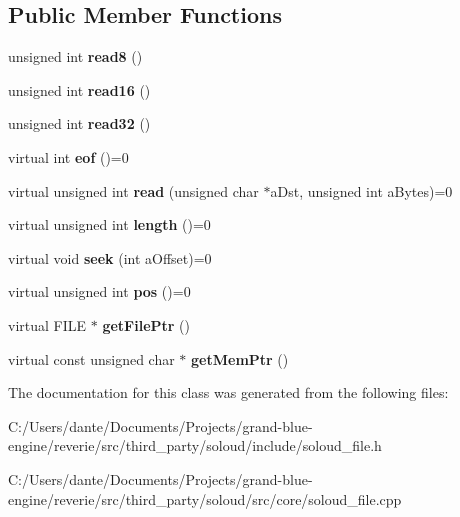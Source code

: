 \subsection*{Public Member Functions}
\begin{DoxyCompactItemize}
\item 
\mbox{\label{class_so_loud_1_1_file_a3197f0c2cb0fa1a22e1d97ddac0cb87c}} 
unsigned int {\bfseries read8} ()
\item 
\mbox{\label{class_so_loud_1_1_file_a04257b2a791b22e5bef066584fa3a7e6}} 
unsigned int {\bfseries read16} ()
\item 
\mbox{\label{class_so_loud_1_1_file_a637dbdf79b7afab25d17fc1be032ff70}} 
unsigned int {\bfseries read32} ()
\item 
\mbox{\label{class_so_loud_1_1_file_ad396b449fdfc04b2a5def8d1ccf98b17}} 
virtual int {\bfseries eof} ()=0
\item 
\mbox{\label{class_so_loud_1_1_file_ad4c53f330a32d0af3d5e90d0add22274}} 
virtual unsigned int {\bfseries read} (unsigned char $\ast$a\+Dst, unsigned int a\+Bytes)=0
\item 
\mbox{\label{class_so_loud_1_1_file_aa25300482995ab849ca6e0115b9bd7bf}} 
virtual unsigned int {\bfseries length} ()=0
\item 
\mbox{\label{class_so_loud_1_1_file_a28078d314c7b390edd82469f7e4d75a4}} 
virtual void {\bfseries seek} (int a\+Offset)=0
\item 
\mbox{\label{class_so_loud_1_1_file_a619881eac4b1c7e0867d0924970bf916}} 
virtual unsigned int {\bfseries pos} ()=0
\item 
\mbox{\label{class_so_loud_1_1_file_a137ccbea0200f10f0e6f3c1314e5e0a6}} 
virtual F\+I\+LE $\ast$ {\bfseries get\+File\+Ptr} ()
\item 
\mbox{\label{class_so_loud_1_1_file_aa23f6a8ae4717ee965a09039f22ea1f0}} 
virtual const unsigned char $\ast$ {\bfseries get\+Mem\+Ptr} ()
\end{DoxyCompactItemize}


The documentation for this class was generated from the following files\+:\begin{DoxyCompactItemize}
\item 
C\+:/\+Users/dante/\+Documents/\+Projects/grand-\/blue-\/engine/reverie/src/third\+\_\+party/soloud/include/soloud\+\_\+file.\+h\item 
C\+:/\+Users/dante/\+Documents/\+Projects/grand-\/blue-\/engine/reverie/src/third\+\_\+party/soloud/src/core/soloud\+\_\+file.\+cpp\end{DoxyCompactItemize}
